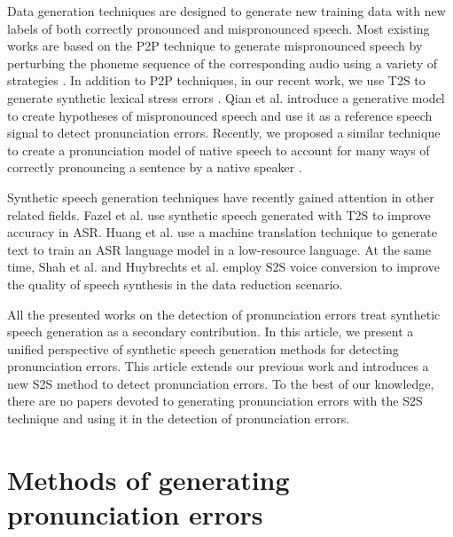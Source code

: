 \documentclass[]{interact}
\theoremstyle{plain}%
\theoremstyle{definition}
\theoremstyle{remark}
\begin{document}
Data generation techniques are designed to generate new training data with new labels of both correctly pronounced and mispronounced speech. Most existing works are based on the P2P technique to generate mispronounced speech by perturbing the phoneme sequence of the corresponding audio using a variety of strategies \cite{lee2016language, komatsu2019speech, fu2021full, yan2021maximum,korzekwa2021mispronunciation}. In addition to P2P techniques, in our recent work, we use T2S to generate synthetic lexical stress errors \cite{korzekwa21b_interspeech}. Qian et al. \cite{qian2010capturing} introduce a generative model to create hypotheses of mispronounced speech and use it as a reference speech signal to detect pronunciation errors. Recently, we proposed a similar technique to create a pronunciation model of native speech to account for many ways of correctly pronouncing a sentence by a native speaker \cite{korzekwa2021mispronunciation}.

Synthetic speech generation techniques have recently gained attention in other related fields. Fazel et al. \cite{fazel21_interspeech} use synthetic speech generated with T2S to improve accuracy in ASR. Huang et al. \cite{huang2016machine} use a machine translation technique to generate text to train an ASR language model in a low-resource language. At the same time, Shah et al. \cite{shah21_ssw} and Huybrechts et al. \cite{huybrechts2021low} employ S2S voice conversion to improve the quality of speech synthesis in the data reduction scenario.

All the presented works on the detection of pronunciation errors treat synthetic speech generation as a secondary contribution. In this article, we present a unified perspective of synthetic speech generation methods for detecting pronunciation errors. This article extends our previous work \cite{korzekwa2021mispronunciation,korzekwa21_interspeech,korzekwa21b_interspeech} and introduces a new S2S method to detect pronunciation errors. To the best of our knowledge, there are no papers devoted to generating pronunciation errors with the S2S technique and using it in the detection of pronunciation errors.

\section{Methods of generating pronunciation errors}
\label{sec:synth_speech_generation_methods}
\end{document}
